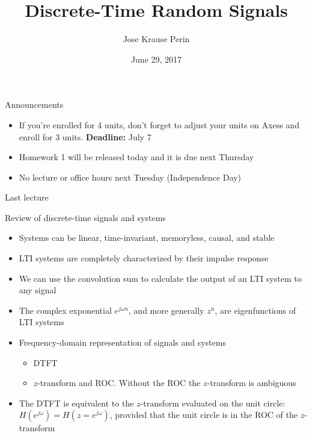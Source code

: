 \documentclass[10pt]{beamer}
\title[EE 264]{Discrete-Time Random Signals}
\author{Jose Krause Perin}
\institute{Stanford University}
\date{June 29, 2017}
\begin{document}
\begin{frame}
  \titlepage
\end{frame}


\begin{frame}{Announcements}

\begin{itemize}
	\item If you're enrolled for 4 units, don't forget to adjust your units on Axess and enroll for 3 units. \textbf{Deadline:} July 7
	\item Homework 1 will be released today and it is due next Thursday
	\item No lecture or office hours next Tuesday (Independence Day)
\end{itemize}

\end{frame}

\begin{frame}{Last lecture}

\begin{block}{Review of discrete-time signals and systems}
	\begin{itemize}
		\item Systems can be linear, time-invariant, memoryless, causal, and stable \\
		\item LTI systems are completely characterized by their impulse response \\
		\item We can use the convolution sum to calculate the output of an LTI system to any signal \\
		\item The complex exponential $e^{j\omega n}$, and more generally $z^n$, are eigenfunctions of LTI systems
		\item Frequency-domain representation of signals and systems
		\begin{itemize}
			\item DTFT
			\item $z$-transform and ROC. Without the ROC the $z$-transform is ambiguous
		\end{itemize}
		\item The DTFT is equivalent to the $z$-transform evaluated on the unit circle: $H(e^{j\omega}) = H(z = e^{j\omega})$, provided that the unit circle is in the ROC of the $z$-transform
	\end{itemize}
\end{block}

\end{frame}
\end{document}
